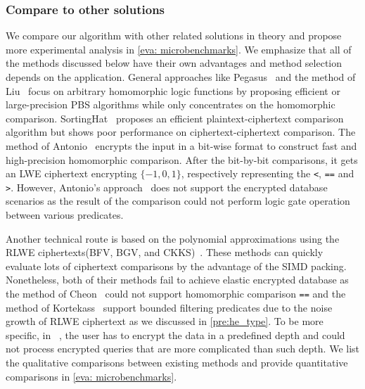 \subsubsection{Compare to other solutions}
We compare our algorithm with other related solutions in theory
and propose more experimental analysis in \cref{eva: microbenchmarks}.
We emphasize that all of the methods discussed below 
have their own advantages and 
method selection depends on the application.
General approaches like Pegasus~\cite{pegasus} and the method 
of Liu~\cite{largeprecision} focus on arbitrary homomorphic logic
functions by proposing efficient or large-precision PBS algorithms
while \NAME only concentrates on the homomorphic comparison.
SortingHat~\cite{sortinghat} proposes an efficient plaintext-ciphertext 
comparison algorithm but shows poor performance on ciphertext-ciphertext
comparison. The method of Antonio~\cite{revisiting} encrypts the input 
in a bit-wise format to construct fast and high-precision
homomorphic comparison. After the bit-by-bit comparisons, it 
gets an LWE ciphertext encrypting $\{-1,0,1\}$, 
respectively representing the \texttt{<}, \texttt{==} and \texttt{>}.
However, Antonio's approach~\cite{revisiting} does not support 
the encrypted database scenarios as the result of the comparison 
could not perform logic gate operation between various predicates.

Another technical route is based on the polynomial approximations 
using the RLWE ciphertexts(BFV, BGV, and CKKS)~\cite{ckkscomparison, aphadb}.
These methods can quickly evaluate lots of ciphertext comparisons 
by the advantage of the SIMD packing.
Nonetheless, both of their methods fail to achieve elastic encrypted 
database as the method of Cheon~\cite{ckkscomparison} could not 
support homomorphic comparison \texttt{==} and the method of 
Kortekass~\cite{aphadb} support bounded filtering predicates 
due to the noise growth of RLWE ciphertext 
as we discussed in \cref{pre:he_type}.
To be more specific, in ~\cite{aphadb}, the user has to encrypt the 
data in a predefined depth and could not process 
encrypted queries that are more complicated than such depth.
We list the qualitative comparisons between existing methods and 
provide quantitative comparisons in \cref{eva: microbenchmarks}.

